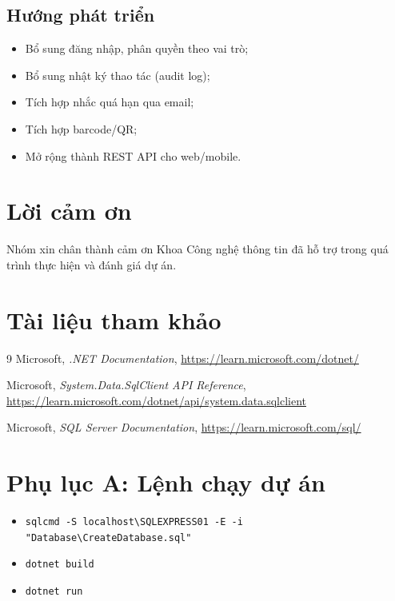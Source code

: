 \documentclass[12pt,a4paper]{article}
\begin{document}
\subsection{Hướng phát triển}
\begin{itemize}[leftmargin=1.5cm]
    \item Bổ sung đăng nhập, phân quyền theo vai trò;
    \item Bổ sung nhật ký thao tác (audit log);
    \item Tích hợp nhắc quá hạn qua email;
    \item Tích hợp barcode/QR;
    \item Mở rộng thành REST API cho web/mobile.
\end{itemize}

\section*{Lời cảm ơn}
Nhóm xin chân thành cảm ơn Khoa Công nghệ thông tin đã hỗ trợ trong quá trình thực hiện và đánh giá dự án.

\section*{Tài liệu tham khảo}
\begin{thebibliography}{9}
Microsoft, \textit{.NET Documentation}, \url{https://learn.microsoft.com/dotnet/}

Microsoft, \textit{System.Data.SqlClient API Reference}, \url{https://learn.microsoft.com/dotnet/api/system.data.sqlclient}

Microsoft, \textit{SQL Server Documentation}, \url{https://learn.microsoft.com/sql/}
\end{thebibliography}

\appendix
\section{Phụ lục A: Lệnh chạy dự án}
\begin{itemize}[leftmargin=1.5cm]
    \item \texttt{sqlcmd -S localhost\textbackslash SQLEXPRESS01 -E -i "Database\textbackslash CreateDatabase.sql"}
    \item \texttt{dotnet build}
    \item \texttt{dotnet run}
\end{itemize}
\end{document}
